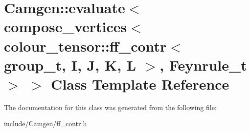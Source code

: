 \hypertarget{a00170}{\section{Camgen\-:\-:evaluate$<$ compose\-\_\-vertices$<$ colour\-\_\-tensor\-:\-:ff\-\_\-contr$<$ group\-\_\-t, I, J, K, L $>$, Feynrule\-\_\-t $>$ $>$ Class Template Reference}
\label{a00170}
}


The documentation for this class was generated from the following file\-:\begin{DoxyCompactItemize}
\item 
include/\-Camgen/ff\-\_\-contr.\-h\end{DoxyCompactItemize}
